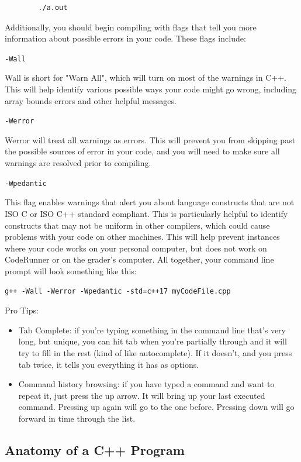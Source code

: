 \begin{verbatim}
        ./a.out
\end{verbatim}

Additionally, you should begin compiling with flags that tell you more information about possible errors in your code. These flags include:

\texttt{-Wall}

Wall is short for "Warn All", which will turn on most of the warnings in C++. This will help identify various possible ways your code might go wrong, including array bounds errors and other helpful messages.

\texttt{-Werror}

Werror will treat all warnings as errors. This will prevent you from skipping past the possible sources of error in your code, and you will need to make sure all warnings are resolved prior to compiling.

\texttt{-Wpedantic}

This flag enables warnings that alert you about language constructs that are not ISO C or ISO C++ standard compliant. This is particularly helpful to identify constructs that may not be uniform in other compilers, which could cause problems with your code on other machines. This will help prevent instances where your code works on your personal computer, but does not work on CodeRunner or on the grader's computer. All together, your command line prompt will look something like this:

\texttt{g++ -Wall -Werror -Wpedantic -std=c++17 myCodeFile.cpp}

Pro Tips:
\begin{itemize}
    \item Tab Complete: if you're typing something in the command line that’s very long, but unique, you can hit tab when you're partially through and it will try to fill in the rest (kind of like autocomplete). If it doesn't, and you press tab twice, it tells you everything it has as options.
    \item Command history browsing: if you have typed a command and want to repeat it, just press the up arrow. It will bring up your last executed command. Pressing up again will go to the one before. Pressing down will go forward in time through the list.
\end{itemize}

\subsection{Anatomy of a C++ Program}

